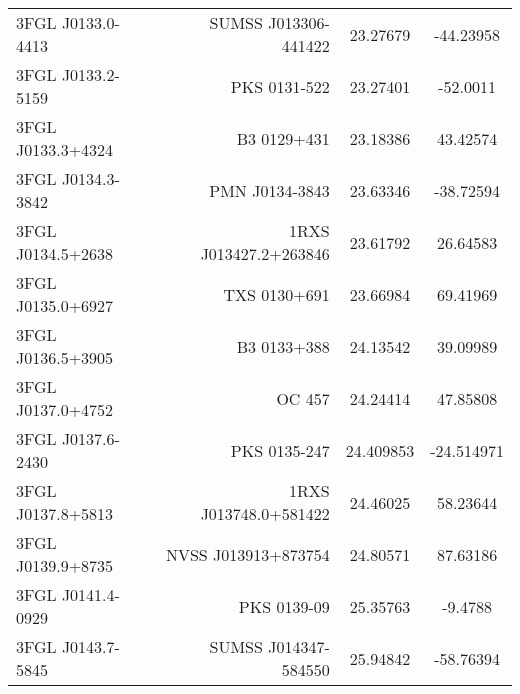 \begin{table}
\begin{tabular}{l r c c}
3FGL J0133.0-4413  &  SUMSS J013306-441422  &  23.27679  &  -44.23958  \\
3FGL J0133.2-5159  &  PKS 0131-522  &  23.27401  &  -52.0011  \\
3FGL J0133.3+4324  &  B3 0129+431  &  23.18386  &  43.42574  \\
3FGL J0134.3-3842  &  PMN J0134-3843  &  23.63346  &  -38.72594  \\
3FGL J0134.5+2638  &  1RXS J013427.2+263846  &  23.61792  &  26.64583  \\
3FGL J0135.0+6927  &  TXS 0130+691  &  23.66984  &  69.41969  \\
3FGL J0136.5+3905  &  B3 0133+388  &  24.13542  &  39.09989  \\
3FGL J0137.0+4752  &  OC 457  &  24.24414  &  47.85808  \\
3FGL J0137.6-2430  &  PKS 0135-247  &  24.409853  &  -24.514971  \\
3FGL J0137.8+5813  &  1RXS J013748.0+581422  &  24.46025  &  58.23644  \\
3FGL J0139.9+8735  &  NVSS J013913+873754  &  24.80571  &  87.63186  \\
3FGL J0141.4-0929  &  PKS 0139-09  &  25.35763  &  -9.4788  \\
3FGL J0143.7-5845  &  SUMSS J014347-584550  &  25.94842  &  -58.76394  \\
\bottomrule
\end{tabular}
\end{table}


